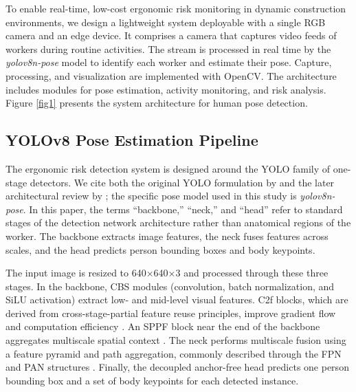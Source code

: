 \documentclass[11pt]{article}
\begin{document}
To enable real-time, low-cost ergonomic risk monitoring in dynamic construction environments, we design a lightweight system deployable with a single RGB camera and an edge device. It comprises a camera that captures video feeds of workers during routine activities. The stream is processed in real time by the \textit{yolov8n-pose} model to identify each worker and estimate their pose. Capture, processing, and visualization are implemented with OpenCV. The architecture includes modules for pose estimation, activity monitoring, and risk analysis. Figure \ref{fig1} presents the system architecture for human pose detection. 


\subsection{YOLOv8 Pose Estimation Pipeline}

The ergonomic risk detection system is designed around the YOLO family of one-stage detectors. We cite both the original YOLO formulation by \citet{redmon2016yolo} and the later architectural review by \citet{terven2023comprehensive}; the specific pose model used in this study is \textit{yolov8n-pose}. In this paper, the terms ``backbone,'' ``neck,'' and ``head'' refer to standard stages of the detection network architecture rather than anatomical regions of the worker. The backbone extracts image features, the neck fuses features across scales, and the head predicts person bounding boxes and body keypoints.

The input image is resized to 640×640×3 and processed through these three stages. In the backbone, CBS modules (convolution, batch normalization, and SiLU activation) extract low- and mid-level visual features. C2f blocks, which are derived from cross-stage-partial feature reuse principles, improve gradient flow and computation efficiency \citep{wang2020cspnet}. An SPPF block near the end of the backbone aggregates multiscale spatial context \citep{he2015spatial}. The neck performs multiscale fusion using a feature pyramid and path aggregation, commonly described through the FPN and PAN structures \citep{lin2017fpn,liu2018panet}. Finally, the decoupled anchor-free head predicts one person bounding box and a set of body keypoints for each detected instance.
\end{document}
